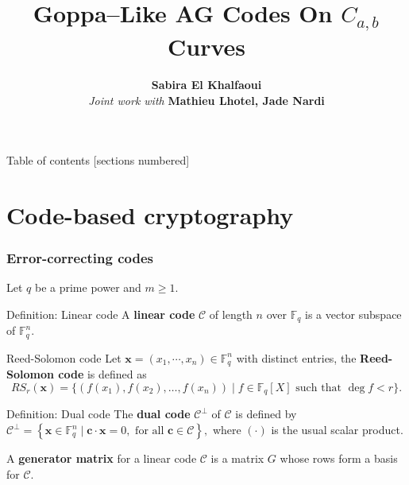 \documentclass[
10pt, %
%
aspectratio=169, %
]{beamer}
\title[Goppa-Like AG codes Distinguisher]{Goppa–Like AG Codes On $C_{a,b}$ Curves}
\author[SEK]{\textbf{Sabira El Khalfaoui} \vspace{0.3cm}\\\vspace{1cm} \textit{\textcolor{amaranth}{Joint work with}} \textbf{Mathieu Lhotel, Jade Nardi}}
\institute[]{\large{\textbf{Journ\'ee de} \\ \smallskip \textit{\textcolor{amaranth}{l'IRMAR}\\ \vspace{-0.3em}\textbf{30 mai 2023}}}}
\date[Mai 2023]
\theoremstyle{plain}%
\theoremstyle{definition}
\theoremstyle{remark}
\newcommand{\calC}{\mathcal{C}}
\newcommand{\fq}{\mathbb{F}_{q}}
\begin{document}
	
	\maketitle
	
	\begin{frame}{Table of contents}
		[sections numbered]
		\tableofcontents%
	\end{frame}
	
	\section{Code-based cryptography}
	\begin{frame}
		\frametitle{Error-correcting codes}
		Let $q$ be a prime power and $m \geq 1$. 
		\begin{block}{Definition: Linear code}
			A \textbf{linear code} $\calC$ of length $n$ over $\fq$ is a vector subspace of $\fq^n$.
		\end{block}
	\begin{block}{Reed-Solomon code}
		Let $\mathbf{x}=(x_1,\cdots,x_n) \in \fq^n$ with distinct entries, the \textbf{Reed-Solomon code} is defined as
		\vspace{-0.7em}
		$$RS_r(\mathbf{x})=\{(f(x_1),f(x_2),\dots,f(x_n)) \mid f \in \fq[X] \text{ such that } \deg f < r \}.$$
	\end{block}
		\begin{block}{Definition: Dual code}
			The \textbf{dual code} $\calC^{\perp}$ of $\calC$ is defined by 
		$\calC^{\perp}=\left\lbrace \mathbf{x} \in \fq^n \mid \mathbf{c} \cdot \mathbf{x}=0, \text{ for all } \mathbf{c} \in \calC \right\rbrace,$
			where $(\cdot)$ is the usual scalar product.
		\end{block}
		\begin{tcolorbox}[colback=white,colframe=palatinatepurple]
			A \textbf{generator matrix} for a linear code $\calC$ is a matrix $G$ whose rows form a basis for $\calC$.
		\end{tcolorbox}
		
	\end{frame}
\end{document}
